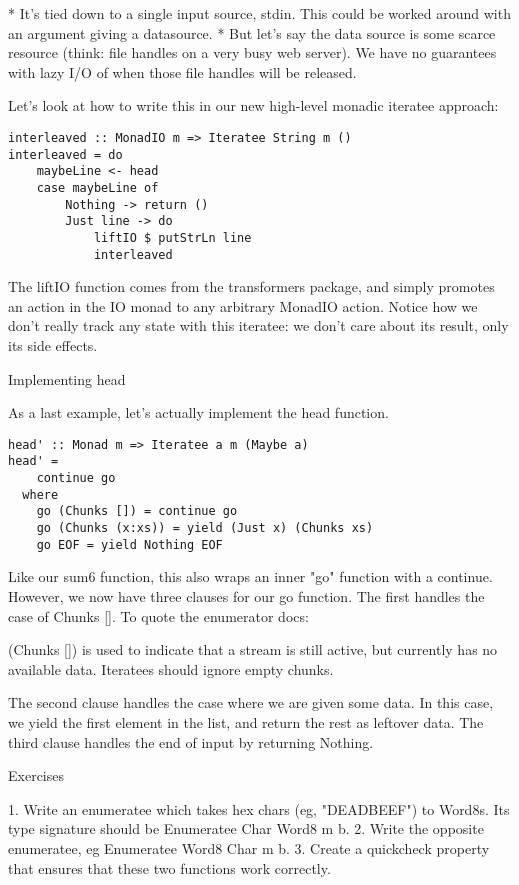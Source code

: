 * It's tied down to a single input source, stdin. This could be worked around with an argument giving a datasource.
* But let's say the data source is some scarce resource (think: file handles on a very busy web server). We have no guarantees with lazy I/O of when those file handles will be released.

Let's look at how to write this in our new high-level monadic iteratee approach:

\begin{lstlisting}
interleaved :: MonadIO m => Iteratee String m ()
interleaved = do
    maybeLine <- head
    case maybeLine of
        Nothing -> return ()
        Just line -> do
            liftIO $ putStrLn line
            interleaved
\end{lstlisting}

The liftIO function comes from the transformers package, and simply promotes an action in the IO monad to any arbitrary MonadIO action. Notice how we don't really track any state with this iteratee: we don't care about its result, only its side effects.

Implementing head

As a last example, let's actually implement the head function.

\begin{lstlisting}
head' :: Monad m => Iteratee a m (Maybe a)
head' =
    continue go
  where
    go (Chunks []) = continue go
    go (Chunks (x:xs)) = yield (Just x) (Chunks xs)
    go EOF = yield Nothing EOF
\end{lstlisting}

Like our sum6 function, this also wraps an inner "go" function with a continue. However, we now have three clauses for our go function. The first handles the case of Chunks []. To quote the enumerator docs:

(Chunks []) is used to indicate that a stream is still active, but currently has no available data. Iteratees should ignore empty chunks.

The second clause handles the case where we are given some data. In this case, we yield the first element in the list, and return the rest as leftover data. The third clause handles the end of input by returning Nothing.

Exercises

1. Write an enumeratee which takes hex chars (eg, "DEADBEEF") to Word8s. Its type signature should be Enumeratee Char Word8 m b.
2. Write the opposite enumeratee, eg Enumeratee Word8 Char m b.
3. Create a quickcheck property that ensures that these two functions work correctly.

